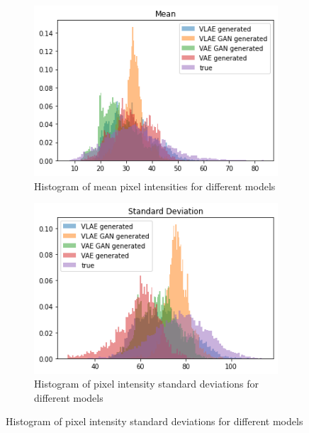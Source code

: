 \begin{figure}
    \centering
    \begin{subfigure}{0.4\textwidth}
        \centering
        \includegraphics[width=\textwidth]{images/generated_vs_true/mnist_vs_models_mean_gauss_post.png}
        \caption{Histogram of mean pixel intensities for different models}
        \label{subfig:mean_generated_vs_true_gauss_post}
    \end{subfigure}
    \hfill
    \begin{subfigure}{0.4\textwidth}
        \centering
        \includegraphics[width=\textwidth]{images/generated_vs_true/mnist_vs_models_sd_gauss_post.png}
        \caption{Histogram of pixel intensity standard deviations for different models}
        \label{subfig:sd_generated_vs_true_gauss_post}
    \end{subfigure}

\end{figure}
